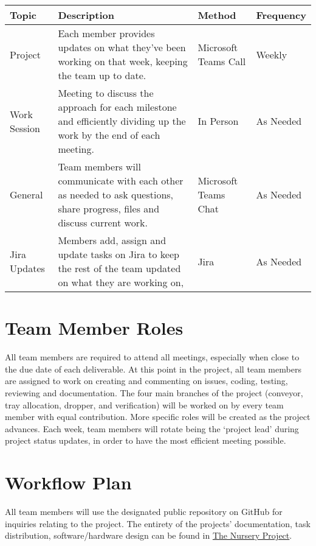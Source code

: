 \documentclass{article}
\begin{document}
	\begin{table}[hp]
		\label{crouch}
		\begin{tabular}{ p{2.4cm}  p{5 cm} p{2 cm} p{1.5 cm}}
			\toprule     
	 \textbf{Topic}   
	& \textbf{Description} 
	& \textbf{Method} 
	& \textbf{Frequency} \\\midrule
	
	 Project \vspace{ Status Updates}   
	& Each member provides updates on what they’ve been working on that week, keeping the team up to date.   
	& Microsoft Teams Call
	& Weekly\\\hline
		 
	Work Session                   
	& Meeting to discuss the approach for each milestone and efficiently dividing up the work by the end of each meeting.  
	& In Person
	& As Needed\\\hline
		  
	General \vspace {Discussion and Updates } 
	& Team members will communicate with each other as needed to ask questions, share progress, files and discuss current work.
	& Microsoft Teams Chat
	& As Needed\\\hline
	
	Jira Updates       
	& Members add, assign and update tasks on Jira to keep the rest of the team updated on what they are working on, 
	& Jira
	& As Needed\\
			\bottomrule
		\end{tabular}
	\end{table}
	\clearpage
	\section{Team Member Roles}
	All team members are required to attend all meetings, especially when close to the due date of each deliverable. At this point in the project, all team members are assigned to work on creating and commenting on issues, coding, testing, reviewing and documentation. The four main branches of the project (conveyor, tray allocation, dropper, and verification) will be worked on by every team member with equal contribution. More specific roles will be created as the project advances. Each week, team members will rotate being the ‘project lead’ during project status updates, in order to have the most efficient meeting possible. 

	\section{Workflow Plan}
	All team members will use the designated public repository on GitHub 
	for inquiries relating to the project. The entirety of the projects’ 
	documentation, task distribution, software/hardware design can be found 
	in \href{https://github.com/aaronbilly22/The_Nursery_Project}{The Nursery Project}.
	
\end{document}
